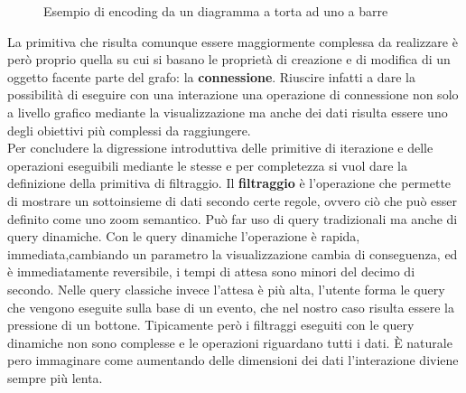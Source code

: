 {\begin{figure}[!htb]
\begin{center}
	\end{center}
	\caption{Esempio di encoding da un diagramma a torta ad uno a barre\label{fig:pieToBar}}
\end{figure}
La primitiva che risulta comunque essere maggiormente complessa da realizzare è però proprio quella su cui si basano le proprietà di creazione e di modifica di un oggetto facente parte del grafo: la \textbf{connessione}.
Riuscire infatti a dare la possibilità di eseguire con una interazione una operazione di connessione non solo a livello grafico mediante la visualizzazione ma anche dei dati risulta essere uno degli obiettivi più complessi da raggiungere.\\
Per concludere la digressione introduttiva delle primitive di iterazione e delle operazioni eseguibili mediante le stesse e per completezza si vuol dare la definizione della primitiva di filtraggio.
Il \textbf{filtraggio} è l’operazione che permette di mostrare un sottoinsieme di dati secondo certe regole, ovvero ciò che può esser definito come uno zoom semantico. Può far uso di query tradizionali ma anche di query dinamiche. Con le query dinamiche l’operazione è rapida, immediata,cambiando un parametro la visualizzazione cambia di conseguenza, ed è immediatamente reversibile, i tempi di attesa sono minori del decimo di secondo. Nelle query classiche invece l’attesa è più alta, l’utente forma le query che vengono eseguite sulla base di un evento, che nel nostro caso risulta essere la pressione di un bottone. Tipicamente però i filtraggi eseguiti con le query dinamiche non sono complesse e le operazioni riguardano tutti i dati. È naturale pero immaginare come aumentando delle dimensioni dei dati l’interazione diviene sempre più lenta.\\ 

}
